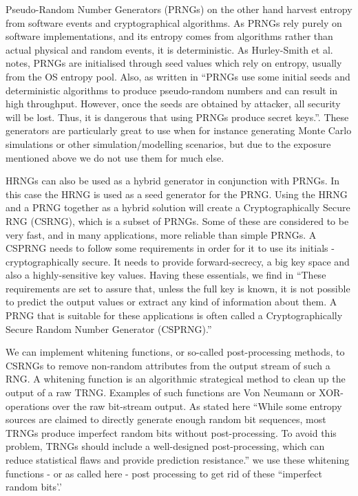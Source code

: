 \documentclass[]{final_report}
\begin{document}
\par{Pseudo-Random Number Generators (PRNGs) on the other hand harvest entropy from software events and cryptographical algorithms. As PRNGs rely purely on software implementations, and its entropy comes from algorithms rather than actual physical and random events, it is deterministic. As Hurley-Smith et al.\cite{Smith:2018} notes, PRNGs are initialised through seed values which rely on entropy, usually from the OS entropy pool. Also, as written in \cite{Gong:2019} ``PRNGs use some initial seeds and deterministic algorithms to produce pseudo-random numbers and can result in high throughput. However, once the seeds are obtained by attacker, all security will be lost. Thus, it is dangerous that using PRNGs produce secret keys.''. These generators are particularly great to use when for instance generating Monte Carlo simulations\cite{Bosque:2019} or other simulation/modelling scenarios, but due to the exposure mentioned above we do not use them for much else.}

\par{HRNGs can also be used as a hybrid generator in conjunction with PRNGs. In this case the HRNG is used as a seed generator for the PRNG. Using the HRNG and a PRNG together as a hybrid solution will create a Cryptographically Secure RNG (CSRNG), which is a subset of PRNGs. Some of these are considered to be very fast, and in many applications, more reliable than simple PRNGs\cite{Bosque:2019}. A CSPRNG needs to follow some requirements in order for it to use its initials - cryptographically secure. It needs to provide forward-secrecy, a big key space and also a highly-sensitive key values. Having these essentials, we find in \cite{Bosque:2019} ``These requirements are set to assure that, unless the full key is known, it is not possible to predict the output values or extract any kind of information about them. A PRNG that is suitable for these applications is often called a Cryptographically Secure Random Number Generator (CSPRNG).''}

\par{We can implement whitening functions, or so-called post-processing methods, to CSRNGs to remove non-random attributes from the output stream of such a RNG\cite{Holleman:2008}. A whitening function is an algorithmic strategical method to clean up the output of a raw TRNG. Examples of such functions are Von Neumann or XOR-operations over the raw bit-stream output. As stated here \cite{Gong:2019} ``While some entropy sources are claimed to directly generate enough random bit sequences, most TRNGs produce imperfect random bits without post-processing. To avoid this problem, TRNGs should include a well-designed post-processing, which can reduce statistical flaws and provide prediction resistance.'' we use these whitening functions - or as called here - post processing to get rid of these ``imperfect random bits'.'}
\end{document}

